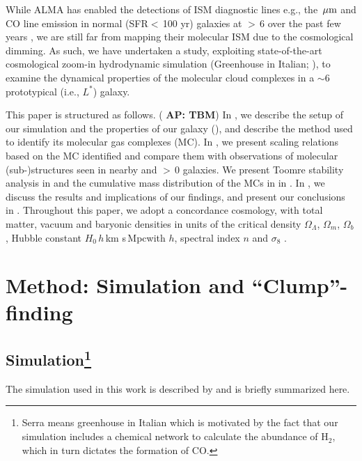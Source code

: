 \documentclass[iop]{emulateapj} %
\newcommand{\AP}[1]{({\bf \color{apcolor} AP: #1})}
\begin{document}
While ALMA has enabled the detections of
ISM diagnostic lines e.g., the \,$\mbox{$\mu$m}$ and CO line emission in
normal (SFR$<$\,100\,\Msun\,yr\pmOne) galaxies at \z$>$\,6 over the past few years \citep[e.g.,][]{Smit18a},
we are still far from mapping their molecular ISM due to the cosmological dimming.
As such, we have undertaken a study, exploiting
state-of-the-art cosmological zoom-in hydrodynamic simulation
 (Greenhouse in Italian; \citealt{Pallottini17a, Pallottini17b}), to examine
the dynamical properties of the molecular cloud complexes in a \z$\sim$6 prototypical (i.e., $L^*$) 
galaxy.

This paper is structured as follows.
\AP{TBM}
In , we describe the setup of our simulation and the properties of our galaxy (\flower),
and describe the method used to identify its molecular gas complexes (MC).
In , we present scaling relations based on
the MC identified and compare them with observations of molecular
(sub-)structures seen in nearby and \z$>$\,0 galaxies.
We present Toomre stability analysis in  and
the cumulative mass distribution of the MCs in \flower in .
In , we discuss the results and implications of our findings,
and present our conclusions in .
Throughout this paper, we adopt a concordance cosmology, with total matter, vacuum and baryonic densities
in units of the critical density $\Omega_{\Lambda}$, $\Omega_m$, $\Omega_b$,
Hubble constant $H_0$\,$h$\,km s\pmOne\,Mpc\pmOne with $h$,
spectral index $n$ and $\sigma_8$ \citep{Planck14a}.


\section{Method: Simulation and ``Clump''-finding} \label{sec:sim}


\subsection{ Simulation\footnote{Serra means greenhouse in Italian which is motivated by the
fact that our simulation includes a chemical network to calculate the abundance of H$_2$, which in turn
dictates the formation of CO.
}}
The simulation used in this work is described by \citealt{Pallottini17a} and is briefly summarized here.
\end{document}
